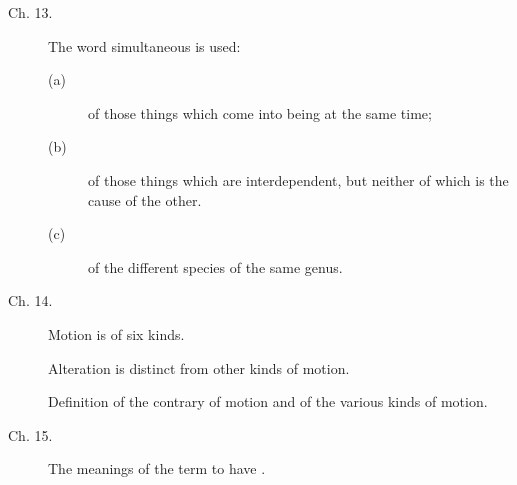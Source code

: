 \begin{description}
\item[Ch. 13.] The word simultaneous is used: 
\begin{description}
\item[(a)] of those things which come into being at the same time;
\item[(b)] of those things which are interdependent, but neither of which is the cause of the other.
\item[(c)] of the different species of the same genus. 
\end{description}

\item[Ch. 14.] Motion is of six kinds. 

Alteration is distinct from other kinds of motion. 

Definition of the contrary of motion and of the various kinds of motion. 

\item[Ch. 15.] The meanings of the term to have . 
\end{description}

\renewcommand{\aref}{\arefC}
